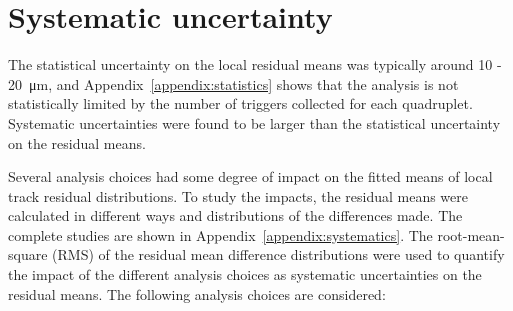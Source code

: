 \newpage
\restoregeometry

\section{Systematic uncertainty}
\label{sec:cosmics_sys_uncerts}

The statistical uncertainty on the local residual means was typically around \SI{10}{} - \SI{20}{\micro\meter}, and Appendix~\ref{appendix:statistics} shows that the analysis is not statistically limited by the number of triggers collected for each quadruplet. Systematic uncertainties were found to be larger than the statistical uncertainty on the residual means.

Several analysis choices had some degree of impact on the fitted means of local track residual distributions. To study the impacts, the residual means were calculated in different ways and distributions of the differences made. The complete studies are shown in Appendix~\ref{appendix:systematics}. The root-mean-square (RMS) of the residual mean difference distributions were used to quantify the impact of the different analysis choices as systematic uncertainties on the residual means. The following analysis choices are considered:
